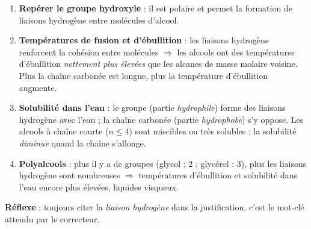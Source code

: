 \documentclass[11pt]{article}
\newcommand{\cle}[1]{{\popxbold\color{popdark}#1}}
\begin{document}
\begin{methode}
\begin{enumerate}
\item \textbf{Repérer le groupe hydroxyle}  : il est polaire et permet la formation de \cle{liaisons hydrogène} entre molécules d'alcool.
\item \textbf{Températures de fusion et d'ébullition} : les liaisons hydrogène renforcent la cohésion entre molécules $\Rightarrow$ les alcools ont des températures d'ébullition \emph{nettement plus élevées} que les alcanes de masse molaire voisine. Plus la chaîne carbonée est longue, plus la température d'ébullition augmente.
\item \textbf{Solubilité dans l'eau} : le groupe  (partie \emph{hydrophile}) forme des liaisons hydrogène avec l'eau ; la chaîne carbonée (partie \emph{hydrophobe}) s'y oppose. Les alcools à chaîne courte ($n \leq 4$) sont miscibles ou très solubles ; la solubilité \emph{diminue} quand la chaîne s'allonge.
\item \textbf{Polyalcools} : plus il y a de groupes  (glycol : 2 ; glycérol : 3), plus les liaisons hydrogène sont nombreuses $\Rightarrow$ températures d'ébullition et solubilité dans l'eau encore plus élevées, liquides visqueux.
\end{enumerate}
\textbf{Réflexe} : toujours citer la \emph{liaison hydrogène} dans la justification, c'est le mot-clé attendu par le correcteur.
\end{methode}
\end{document}
